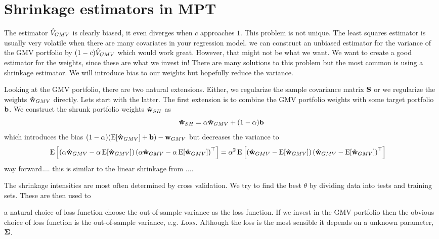 \documentclass[]{book}\usepackage{knitr}
\begin{document}
\section{Shrinkage estimators in MPT}
The estimator $\hat{V}_{GMV}$ is clearly biased, it even diverges when $c$ approaches $1$. This problem is not unique. The least squares estimator is usually very volatile when there are many covariates in your regression model. we can construct an unbiased estimator for the variance of the GMV portfolio by $(1-c)\hat{V}_{GMV}$ which would work great. However, that might not be what we want. We want to create a good estimator for the weights, since these are what we invest in! There are many solutions to this problem but the most common is using a shrinkage estimator. We will introduce bias to our weights but hopefully reduce the variance.

Looking at the GMV portfolio, there are two natural extensions. Either, we regularize the sample covariance matrix $\mathbf{S}$ or we regularize the weights $\mathbf{\hat{w}}_{GMV}$ directly. Lets start with the latter. The first extension is to combine the GMV portfolio weights with some target portfolio $\mathbf{b}$. We construct the shrunk portfolio weights $\mathbf{\hat{w}}_{SH}$ as
\begin{equation}
  \mathbf{\hat{w}}_{SH} = \alpha\mathbf{\hat{w}}_{GMV} + (1-\alpha)\mathbf{b}
\end{equation}
which introduces the bias $(1-\alpha)(\operatorname{E}[\mathbf{\hat{w}}_{GMV}]+\mathbf{b}) - \mathbf{w}_{GMV}$ but decreases the variance to
\begin{align}
  \operatorname{E}\left[\left(\alpha\mathbf{\hat{w}}_{GMV} - \alpha \operatorname{E}[\mathbf{\hat{w}}_{GMV}]\right)\left(\alpha\mathbf{\hat{w}}_{GMV} - \alpha \operatorname{E}[\mathbf{\hat{w}}_{GMV}]\right)^\top\right] 
  & = 
  \alpha^2\operatorname{E}\left[\left(\mathbf{\hat{w}}_{GMV} - \operatorname{E}[\mathbf{\hat{w}}_{GMV}]\right)\left(\mathbf{\hat{w}}_{GMV} - \operatorname{E}[\mathbf{\hat{w}}_{GMV}]\right)^\top\right]
\end{align}
\citet{bodnar2018estimation} way forward.... this is similar to the linear shrinkage from \citet{REF}....

The shrinkage intensities are most often determined by cross validation. We try to find the best $\theta$ by dividing data into tests and training sets. These are then used to 

a natural choice of loss function  choose the out-of-sample variance as the loss function. If we invest in the GMV portfolio then the obvious choice of loss function is the out-of-sample variance, e.g. $Loss$. Although the loss is the most sensible it depends on a unknown parameter, $\mathbf{\Sigma}$. 

\end{document}
